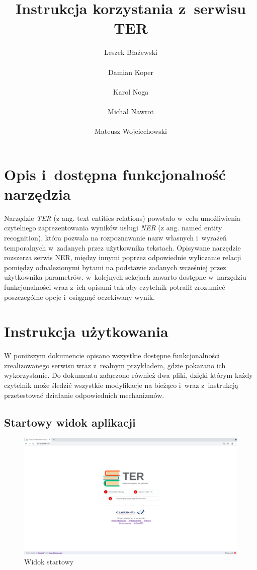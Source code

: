 \documentclass[12pt, a4paper]{article}
\title{ Instrukcja korzystania z~serwisu TER}
\author{ Leszek Błażewski\\\\Damian Koper\\\\Karol Noga\\\\Michał Nawrot\\\\Mateusz Wojciechowski}
\begin{document}
\maketitle
\pagebreak

\tableofcontents
\pagebreak


\section{Opis i~dostępna funkcjonalność narzędzia}

Narzędzie \textit{TER} (z ang. text entities relations) powstało w~celu umożliwienia czytelnego zaprezentowania wyników usługi \textit{NER} (z ang. named entity recognition), która pozwala na rozpoznawanie nazw własnych i~wyrażeń temporalnych w~zadanych przez użytkownika tekstach. Opisywane narzędzie rozszerza serwis NER, między innymi poprzez odpowiednie wyliczanie relacji pomiędzy odnalezionymi bytami na podstawie zadanych wcześniej przez użytkownika parametrów. w~kolejnych sekcjach zawarto dostępne w~narzędziu funkcjonalności wraz z~ich opisami tak aby czytelnik potrafił zrozumieć poszczególne opcje i~osiągnąć oczekiwany wynik.

\section{Instrukcja użytkowania}

W poniższym dokumencie opisano wszystkie dostępne funkcjonalności zrealizowanego serwisu wraz z~realnym przykładem, gdzie pokazano ich wykorzystanie. Do dokumentu załączono również dwa pliki, dzięki którym każdy czytelnik może śledzić wszystkie modyfikacje na bieżąco i~wraz z~instrukcją przetestować działanie odpowiednich mechanizmów.

\pagebreak

\subsection{Startowy widok aplikacji}

\begin{figure}[H]
  \centering
  \includegraphics[width=\linewidth]{images/homepage.png}
  \caption{Widok startowy}
  \label{main-view}
\end{figure}
\end{document}
